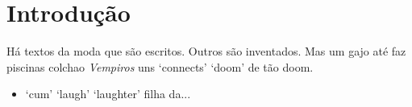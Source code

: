 \section{Introdução}
Há textos da moda que são escritos.
Outros são inventados.
Mas um gajo até faz piscinas colchao \emph{Vempiros} uns `connects' `doom' de tão doom.
\begin{itemize}

\item{ `cum' `laugh' `laughter' filha da...}
\end{itemize}
